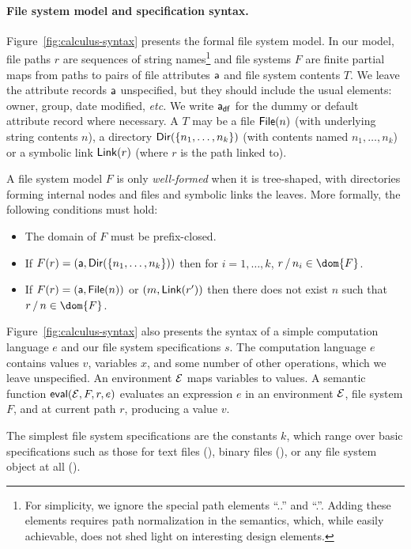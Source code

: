 \paragraph*{File system model and specification syntax.}
Figure~\ref{fig:calculus-syntax} presents the formal file system model.  
In our model, file paths $r$ are
sequences of string names\footnote{For simplicity, we ignore the special path
elements ``..'' and ``.''.  Adding these elements
requires path normalization in the semantics, which, while easily
achievable, does not shed light on interesting design elements.} 
and file systems $F$
are finite partial maps from paths to pairs of file attributes $\mathsf{a}$
and file system contents $T$.  We leave the attribute records $\mathsf{a}$ 
unspecified, but they should include the usual elements: owner, group,
date modified, {\it etc.}  We write $\mathsf{a}_{\mathsf{df}}$ for the dummy or
default attribute record where necessary.
A $T$ may be a file $\mathsf{File}(n)$ (with underlying string contents $n$),
a directory $\mathsf{Dir}( \{ n_1,\dots,n_k \} )$ (with contents named 
$n_1, \ldots, n_k$) or a symbolic link $\mathsf{Link}(r)$ (where $r$ is the
path linked to).  

A file system model $F$ is only {\em well-formed} when it is tree-shaped,
with directories forming internal nodes and files and symbolic
links the leaves.  More formally, the following conditions must hold:
\begin{itemize}
\item The domain of $F$ must be prefix-closed.
\item If $F(r) = (\mathsf{a},\mathsf{Dir}( \{ n_1,\dots,n_k \} ))$ then for $i=1,\ldots,k$,
$\PCons{r}{n_i} \in \dom{F}$.
\item  If $F(r) = (\mathsf{a},\mathsf{File}(n))$ or $(m,\mathsf{Link}(r'))$ then 
there does not exist $n$ such that $\PCons{r}{n} \in \dom{F}$.
\end{itemize}

Figure~\ref{fig:calculus-syntax} also presents the syntax of
a simple computation language $e$ and our
file system specifications $s$.  The computation language $e$
contains values $v$, variables $x$, and some number of other
operations, which we leave unspecified.  An environment
$\mathcal{E}$ maps variables to values.  A semantic function
$\mathsf{eval}(\mathcal{E},F,r,e)$ evaluates an expression $e$ in an
environment $\mathcal{E}$, file system $F$, and at current path $r$,
producing a value $v$.

The simplest file system specifications are the constants
$k$, which range over basic specifications such as those for
text files (\ptext), binary files (\pbin), or any
file system object at all (\pany). 

